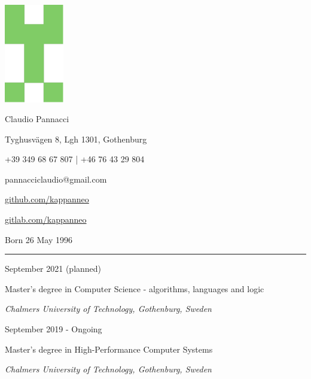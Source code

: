 \documentclass[a4paper,10pt]{article}
\newlength{\cvcolumngapwidth}
\newlength{\cvleftcolumnwidth}
\newlength{\cvrightcolumnwidth}
\newcommand{\cvnamestyle}[1]{{\Large\cvnamefont\textcolor{cvnamecolor}{#1}}}
\newcommand{\cvsectionstyle}[1]{{\normalsize\cvsectionfont\textcolor{cvsectioncolor}{#1}}}
\newcommand{\cvtitlestyle}[1]{{\large\cvtitlefont\textcolor{cvtitlecolor}{#1}}}
\newcommand{\cvdurationstyle}[1]{{\small\cvdurationfont\textcolor{cvdurationcolor}{#1}}}
\newlength{\cvafteritemskipamount}
\newlength{\cvaftersectionskipamount}
\newlength{\cvafternameskipamount}
\newlength{\cvafterpersonalinfolineskipamount}
\newlength{\cvaftertitleskipamount}
\newlength{\cvparskip}
\newcommand{\cvpersonalinfo}[2]{
    \begin{minipage}[t]{\cvleftcolumnwidth}
        \vspace{0mm} %
        \raggedleft #1
    \end{minipage}%
    \hspace{\cvcolumngapwidth}%
    \begin{minipage}[t]{\cvrightcolumnwidth}
        \vspace{0mm} %
        #2
    \end{minipage}

    \vspace{\cvafteritemskipamount}
}
\newcommand{\cvname}[1]{
    \cvnamestyle{#1}

    \vspace{\cvafternameskipamount}
}
\newcommand{\cvpersonalinfolinewithicon}[3]{
    \raisebox{.5\fontcharht\font`E-.5\height}{\texttt{[image: \#2]}}
    #3

    \vspace{\cvafterpersonalinfolineskipamount}
}
\newcommand{\cvsection}[1]{
    \begin{minipage}[t]{\cvleftcolumnwidth}
        \raggedleft\cvsectionstyle{#1}
    \end{minipage}%
    \hspace{\cvcolumngapwidth}%
    \begin{minipage}[t]{\cvrightcolumnwidth}
        \textcolor{cvrulecolor}{\rule{\cvrightcolumnwidth}{0.3mm}}
    \end{minipage}

    \vspace{\cvaftersectionskipamount}
}
\newcommand{\cvitem}[2]{
    \begin{minipage}[t]{\cvleftcolumnwidth}
        \raggedleft #1
    \end{minipage}%
    \hspace{\cvcolumngapwidth}%
    \begin{minipage}[t]{\cvrightcolumnwidth}
        \setlength{\parskip}{\cvparskip} #2
    \end{minipage}

    \vspace{\cvafteritemskipamount}
}
\newcommand{\cvtitle}[1]{
    \cvtitlestyle{#1}

    \vspace{\cvaftertitleskipamount}
    \vspace{-\cvparskip}
}
\begin{document}

\cvpersonalinfo{
     \includegraphics[height=43mm]{kappanneo.pdf} %
}{


    \cvname{Claudio Pannacci}

    \cvpersonalinfolinewithicon{height=4mm}{072-location.pdf}{
        Tyghusvägen 8, Lgh 1301, Gothenburg
    }

    \cvpersonalinfolinewithicon{height=4mm}{067-phone.pdf}{
        +39 349 68 67 807 | +46 76 43 29 804
    }

    \cvpersonalinfolinewithicon{height=4mm}{070-envelop.pdf}{
        pannacciclaudio@gmail.com
    }

    \cvpersonalinfolinewithicon{height=4mm}{github.pdf}{
        \href{https://github.com/kappanneo}{github.com/kappanneo}
    }

    \cvpersonalinfolinewithicon{height=4mm}{gitlab.pdf}{
         \href{https://gitlab.com/kappanneo}{gitlab.com/kappanneo}
    }

    Born 26 May 1996
}



\cvsection{EDUCATION}


\cvitem{
    \cvdurationstyle{September 2021 (planned)}
}{
    \cvtitle{Master's degree in Computer Science - algorithms, languages and logic}
 
    \textit{Chalmers University of Technology, Gothenburg, Sweden}
}

\cvitem{
    \cvdurationstyle{September 2019 - Ongoing}
}{
    \cvtitle{Master's degree in High-Performance Computer Systems}

    \textit{Chalmers University of Technology, Gothenburg, Sweden}
}
\end{document}
